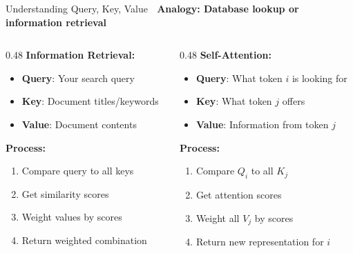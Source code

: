 \documentclass[aspectratio=169]{beamer}
\begin{document}
\begin{frame}[shrink=10]{Understanding Query, Key, Value 🔑}
\small
\textbf{Analogy: Database lookup or information retrieval}

\vspace{1em}

\begin{columns}[T]
\begin{column}{0.48\textwidth}
\textbf{Information Retrieval:}
\begin{itemize}\setlength{\itemsep}{0pt}
    \item \textbf{Query}: Your search query
    \item \textbf{Key}: Document titles/keywords
    \item \textbf{Value}: Document contents
\end{itemize}

\vspace{0.5em}

\textbf{Process:}
\begin{enumerate}\setlength{\itemsep}{0pt}
    \item Compare query to all keys
    \item Get similarity scores
    \item Weight values by scores
    \item Return weighted combination
\end{enumerate}
\end{column}

\begin{column}{0.48\textwidth}
\textbf{Self-Attention:}
\begin{itemize}\setlength{\itemsep}{0pt}
    \item \textbf{Query}: What token $i$ is looking for
    \item \textbf{Key}: What token $j$ offers
    \item \textbf{Value}: Information from token $j$
\end{itemize}

\vspace{0.5em}

\textbf{Process:}
\begin{enumerate}\setlength{\itemsep}{0pt}
    \item Compare $Q_i$ to all $K_j$
    \item Get attention scores
    \item Weight all $V_j$ by scores
    \item Return new representation for $i$
\end{enumerate}
\end{column}
\end{columns}


\end{frame}
\end{document}
